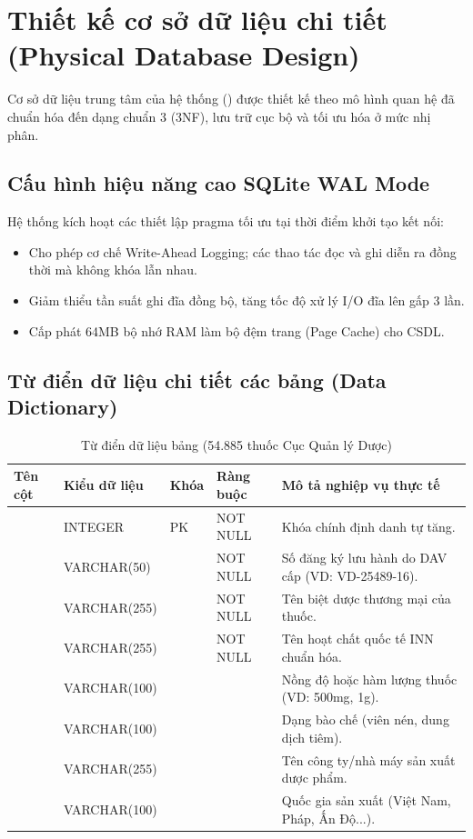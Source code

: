 \section{Thiết kế cơ sở dữ liệu chi tiết (Physical Database Design)}
\label{sec:database_design}

Cơ sở dữ liệu trung tâm của hệ thống () được thiết kế theo mô hình quan hệ đã chuẩn hóa đến dạng chuẩn 3 (3NF), lưu trữ cục bộ và tối ưu hóa ở mức nhị phân.

\subsection{Cấu hình hiệu năng cao SQLite WAL Mode}
Hệ thống kích hoạt các thiết lập pragma tối ưu tại thời điểm khởi tạo kết nối:
\begin{itemize}[leftmargin=1.5em]
    \item {} Cho phép cơ chế Write-Ahead Logging; các thao tác đọc và ghi diễn ra đồng thời mà không khóa lẫn nhau.
    \item {} Giảm thiểu tần suất ghi đĩa đồng bộ, tăng tốc độ xử lý I/O đĩa lên gấp 3 lần.
    \item {} Cấp phát 64MB bộ nhớ RAM làm bộ đệm trang (Page Cache) cho CSDL.
\end{itemize}

\subsection{Từ điển dữ liệu chi tiết các bảng (Data Dictionary)}

\begin{table}[htbp]
\centering
\small
\begin{tabularx}{\textwidth}{L{3.5cm} L{2.2cm} C{1.2cm} C{1.8cm} Y}
\toprule
\textbf{Tên cột} & \textbf{Kiểu dữ liệu} & \textbf{Khóa} & \textbf{Ràng buộc} & \textbf{Mô tả nghiệp vụ thực tế} \\
\midrule
{} & INTEGER & PK & NOT NULL & Khóa chính định danh tự tăng. \\
 & VARCHAR(50) & & NOT NULL & Số đăng ký lưu hành do DAV cấp (VD: VD-25489-16). \\
 & VARCHAR(255) & & NOT NULL & Tên biệt dược thương mại của thuốc. \\
 & VARCHAR(255) & & NOT NULL & Tên hoạt chất quốc tế INN chuẩn hóa. \\
 & VARCHAR(100) & & & Nồng độ hoặc hàm lượng thuốc (VD: 500mg, 1g). \\
 & VARCHAR(100) & & & Dạng bào chế (viên nén, dung dịch tiêm). \\
 & VARCHAR(255) & & & Tên công ty/nhà máy sản xuất dược phẩm. \\
 & VARCHAR(100) & & & Quốc gia sản xuất (Việt Nam, Pháp, Ấn Độ...). \\
\bottomrule
\end{tabularx}
\caption{Từ điển dữ liệu bảng  (54.885 thuốc Cục Quản lý Dược)}
\end{table}

